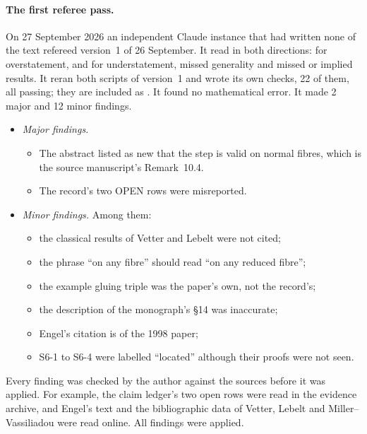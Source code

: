 \paragraph{The first referee pass.}
On 27 September 2026 an independent Claude instance that had written none of the text refereed version~1 of 26 September. It read in both directions: for overstatement, and for understatement, missed generality and missed or implied results. It reran both scripts of version~1 and wrote its own checks, 22 of them, all passing; they are included as . It found no mathematical error. It made 2 major and 12 minor findings.
\begin{itemize}
\item \emph{Major findings.}
\begin{itemize}
\item The abstract listed as new that the step is valid on normal fibres, which is the source manuscript's Remark~10.4.
\item The record's two \textsf{OPEN} rows were misreported.
\end{itemize}
\item \emph{Minor findings.} Among them:
\begin{itemize}
\item the classical results of Vetter and Lebelt were not cited;
\item the phrase ``on any fibre'' should read ``on any reduced fibre'';
\item the example gluing triple was the paper's own, not the record's;
\item the description of the monograph's §14 was inaccurate;
\item Engel's citation is of the 1998 paper;
\item S6-1 to S6-4 were labelled ``located'' although their proofs were not seen.
\end{itemize}
\end{itemize}
Every finding was checked by the author against the sources before it was applied. For example, the claim ledger's two open rows were read in the evidence archive, and Engel's text and the bibliographic data of Vetter, Lebelt and Miller--Vassiliadou were read online. All findings were applied.

